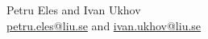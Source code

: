 Petru Eles and Ivan Ukhov\\
\vspace{0.5em}
\href{mailto:petru.eles@liu.se}{petru.eles@liu.se} and \href{mailto:ivan.ukhov@liu.se}{ivan.ukhov@liu.se}
